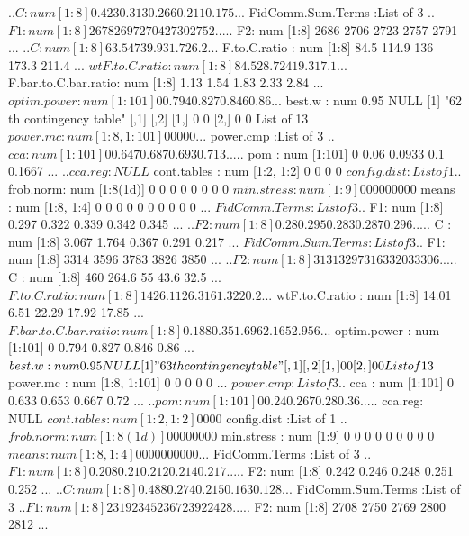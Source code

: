 \documentclass[11pt]{article} %
\begin{document}
\begin{Schunk}
\begin{Soutput}
  ..$ C : num [1:8] 0.423 0.313 0.266 0.211 0.175 ...
 $ FidComm.Sum.Terms   :List of 3
  ..$ F1: num [1:8] 2678 2697 2704 2730 2752 ...
  ..$ F2: num [1:8] 2686 2706 2723 2757 2791 ...
  ..$ C : num [1:8] 63.5 47 39.9 31.7 26.2 ...
 $ F.to.C.ratio        : num [1:8] 84.5 114.9 136 173.3 211.4 ...
 $ wtF.to.C.ratio      : num [1:8] 84.5 28.7 24 19.3 17.1 ...
 $ F.bar.to.C.bar.ratio: num [1:8] 1.13 1.54 1.83 2.33 2.84 ...
 $ optim.power         : num [1:101] 0 0.794 0.827 0.846 0.86 ...
 $ best.w              : num 0.95
NULL
[1] "62 th contingency table"
     [,1] [,2]
[1,]    0    0
[2,]    0    0
List of 13
 $ power.mc            : num [1:8, 1:101] 0 0 0 0 0 ...
 $ power.cmp           :List of 3
  ..$ cca    : num [1:101] 0 0.647 0.687 0.693 0.713 ...
  ..$ pom    : num [1:101] 0 0.06 0.0933 0.1 0.1667 ...
  ..$ cca.reg: NULL
 $ cont.tables         : num [1:2, 1:2] 0 0 0 0
 $ config.dist         :List of 1
  ..$ frob.norm: num [1:8(1d)] 0 0 0 0 0 0 0 0
 $ min.stress          : num [1:9] 0 0 0 0 0 0 0 0 0
 $ means               : num [1:8, 1:4] 0 0 0 0 0 0 0 0 0 0 ...
 $ FidComm.Terms       :List of 3
  ..$ F1: num [1:8] 0.297 0.322 0.339 0.342 0.345 ...
  ..$ F2: num [1:8] 0.28 0.295 0.283 0.287 0.296 ...
  ..$ C : num [1:8] 3.067 1.764 0.367 0.291 0.217 ...
 $ FidComm.Sum.Terms   :List of 3
  ..$ F1: num [1:8] 3314 3596 3783 3826 3850 ...
  ..$ F2: num [1:8] 3131 3297 3163 3203 3306 ...
  ..$ C : num [1:8] 460 264.6 55 43.6 32.5 ...
 $ F.to.C.ratio        : num [1:8] 14 26.1 126.3 161.3 220.2 ...
 $ wtF.to.C.ratio      : num [1:8] 14.01 6.51 22.29 17.92 17.85 ...
 $ F.bar.to.C.bar.ratio: num [1:8] 0.188 0.35 1.696 2.165 2.956 ...
 $ optim.power         : num [1:101] 0 0.794 0.827 0.846 0.86 ...
 $ best.w              : num 0.95
NULL
[1] "63 th contingency table"
     [,1] [,2]
[1,]    0    0
[2,]    0    0
List of 13
 $ power.mc            : num [1:8, 1:101] 0 0 0 0 0 ...
 $ power.cmp           :List of 3
  ..$ cca    : num [1:101] 0 0.633 0.653 0.667 0.72 ...
  ..$ pom    : num [1:101] 0 0.24 0.267 0.28 0.36 ...
  ..$ cca.reg: NULL
 $ cont.tables         : num [1:2, 1:2] 0 0 0 0
 $ config.dist         :List of 1
  ..$ frob.norm: num [1:8(1d)] 0 0 0 0 0 0 0 0
 $ min.stress          : num [1:9] 0 0 0 0 0 0 0 0 0
 $ means               : num [1:8, 1:4] 0 0 0 0 0 0 0 0 0 0 ...
 $ FidComm.Terms       :List of 3
  ..$ F1: num [1:8] 0.208 0.21 0.212 0.214 0.217 ...
  ..$ F2: num [1:8] 0.242 0.246 0.248 0.251 0.252 ...
  ..$ C : num [1:8] 0.488 0.274 0.215 0.163 0.128 ...
 $ FidComm.Sum.Terms   :List of 3
  ..$ F1: num [1:8] 2319 2345 2367 2392 2428 ...
  ..$ F2: num [1:8] 2708 2750 2769 2800 2812 ...

\end{Soutput}
\end{Schunk}
\end{document}
